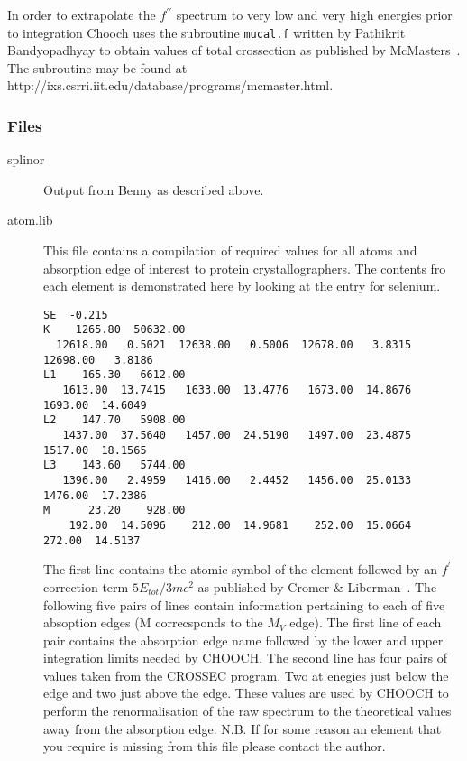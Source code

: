 \documentclass[a4]{article}
\begin{document}
In order to extrapolate the $f^{\prime\prime}$ spectrum to very low
and very high energies prior to integration {\sc Chooch} uses the
subroutine {\tt mucal.f} written by Pathikrit Bandyopadhyay to obtain
values of total crossection as published by
McMasters~\cite{McMasters69}. The subroutine may be found at
http://ixs.csrri.iit.edu/database/programs/mcmaster.html.

\subsubsection{Files}

\begin{description}
\item[splinor] Output from {\sc Benny} as described above.

\item[atom.lib] This file contains a compilation of required values
for all atoms and absorption edge of interest to protein
crystallographers. The contents fro each element is demonstrated here
by looking at the entry for selenium.

\begin{verbatim}
SE  -0.215
K    1265.80  50632.00
  12618.00   0.5021  12638.00   0.5006  12678.00   3.8315  12698.00   3.8186
L1    165.30   6612.00
   1613.00  13.7415   1633.00  13.4776   1673.00  14.8676   1693.00  14.6049
L2    147.70   5908.00
   1437.00  37.5640   1457.00  24.5190   1497.00  23.4875   1517.00  18.1565
L3    143.60   5744.00
   1396.00   2.4959   1416.00   2.4452   1456.00  25.0133   1476.00  17.2386
M      23.20    928.00
    192.00  14.5096    212.00  14.9681    252.00  15.0664    272.00  14.5137
\end{verbatim}

The first line contains the atomic symbol of the element followed by
an $f^{\prime}$ correction term $5E_{tot}/3mc^{2}$ as published by
Cromer \& Liberman~\cite{CromLiberA}. The following five pairs of
lines contain information pertaining to each of five absoption edges
(M correcsponds to the $M_{V}$ edge). The first line of each pair
contains the absorption edge name followed by the lower and upper
integration limits needed by {\sc CHOOCH}. The second line has four
pairs of values taken from the CROSSEC program. Two at enegies just
below the edge and two just above the edge. These values are used by
{\sc CHOOCH} to perform the renormalisation of the raw spectrum to the
theoretical values away from the absorption edge. N.B. If for some
reason an element that you require is missing from this file please
contact the author.


\end{description}
\end{document}
